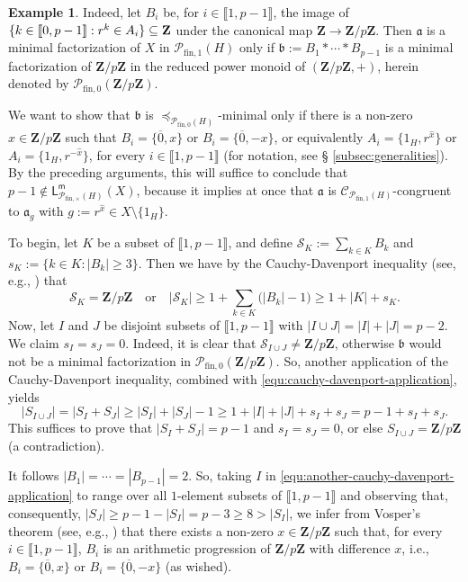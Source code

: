 \documentclass{report}
\newcommand{\llb}{\llbracket}
\newcommand{\rrb}{\rrbracket}
\newcommand{\fin}{\textrm{fin}}
\newcommand{\funt}{{\textrm{fin}, \times}}
\newcommand{\fun}{{\textrm{fin}, 1}}
\newcommand{\m}{{\mathsf{m}}}
\renewcommand{\:}{\text{:}}
\theoremstyle{definition}
\newtheorem{eg}[defn]{Example}
\begin{document}
\begin{eg}
	Indeed, let $B_i$ be, for $i \in \llb 1, p-1 \rrb$, the image of $\{k \in \llb 0, p-1 \rrb: r^k \in A_i\} \subseteq \bf Z$ under the canonical map $\mathbf Z \to \mathbf Z/p\mathbf Z$. Then $\mathfrak a$ is a minimal factorization of $X$ in $\mathcal P_{\fin,1}(H)$ only if $\mathfrak b := B_1 \ast \cdots \ast B_{p-1}$ is a minimal factorization of $\mathbf Z/p\mathbf Z$ in the reduced power monoid of $(\mathbf Z/p\mathbf Z, +)$, herein denoted by $\mathcal P_{\fin,0}(\mathbf Z/p\mathbf Z)$.
	
	We want to show that $\mathfrak b$ is $\preceq_{\mathcal P_{\fin,0}(H)}$-minimal only if there is a non-zero $x \in \mathbf Z/p\mathbf Z$ such that $B_i = \{\overline{0}, x\}$ or $B_i = \{\overline{0}, -x\}$, or equivalently $A_i = \{1_H, r^{\hat{x}}\}$ or $A_i = \{1_H, r^{-\hat{x}}\}$, for every $i \in \llb 1, p-1 \rrb$ (for notation, see \S{ }\ref{subsec:generalities}). By the preceding arguments, this will suffice to conclude that $p-1 \notin \mathsf L^\m_{\mathcal P_\funt(H)}(X)$, because it implies at once that $\mathfrak a$ is $\mathcal C_{\mathcal P_\fun(H)}$-congruent to $\mathfrak a_g$ with $g := r^{\hat{x}} \in X \setminus \{1_H\}$.
	
	To begin, let $K$ be a subset of $\llb 1, p-1 \rrb$, and define $\mathcal{S}_K := \sum_{k \in K} B_k$ and $s_K := \{k \in K: |B_k| \ge 3\}$. Then we have by the Cauchy-Davenport inequality (see, e.g., \cite[Theorem 6.2]{grynkiewicz13}) that
	\begin{equation}\label{equ:cauchy-davenport-application}
	\mathcal{S}_K = \mathbf Z/p\mathbf Z 
	\quad\text{or}\quad
	|\mathcal{S}_K| \ge 1 + {\sum}_{k \in K} \bigl(|B_k| - 1\bigr) \ge 1 + |K| + s_K.
	\end{equation}
	Now, let $I$ and $J$ be disjoint subsets of $\llb 1, p-1 \rrb$ with $|I \cup J| = |I| + |J| = p-2$. We claim $s_I = s_J = 0$. Indeed, it is clear that $\mathcal{S}_{I \cup J} \ne \mathbf Z/p\mathbf Z$, otherwise $\mathfrak b$ would not be a minimal factorization in $\mathcal P_{\fin,0}(\mathbf Z/p\mathbf Z)$. So, another application of the Cauchy-Davenport inequality, combined with \eqref{equ:cauchy-davenport-application}, yields
	\begin{equation}\label{equ:another-cauchy-davenport-application}
	|S_{I \cup J}| = |S_I + S_J| \ge |S_I| + |S_J| - 1 \ge 1 + |I| + |J| + s_I + s_J = p-1 + s_I + s_J.
	\end{equation}
	This suffices to prove that $|S_I + S_J| = p-1$ and $s_I = s_J = 0$, or else $S_{I \cup J} = \mathbf Z/p\mathbf Z$ (a contradiction). 
	
	It follows $|B_1| = \cdots = |B_{p-1}| = 2$. So, taking $I$ in \eqref{equ:another-cauchy-davenport-application} to range over all $1$-element subsets of $\llb 1, p-1 \rrb$ and observing that, consequently, $|S_J| \ge p-1-|S_I| = p-3 \ge 8 > |S_I|$, we infer from Vosper's theorem (see, e.g., \cite[Theorem 8.1]{grynkiewicz13}) that there exists a non-zero $x \in \mathbf Z/p\mathbf Z$ such that, for every $i \in \llb 1, p-1 \rrb$, $B_i$ is an arithmetic progression of $\mathbf Z/p\mathbf Z$ with difference $x$, i.e., $B_i = \{\overline{0}, x\}$ or $B_i = \{\overline{0}, -x\}$ (as wished).
\end{eg}
\end{document}
